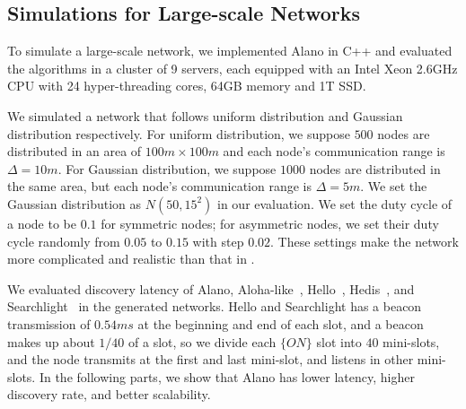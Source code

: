 \subsection{Simulations for Large-scale Networks}


To simulate a large-scale network, we implemented Alano in C++ and evaluated the algorithms in a cluster of 9 servers,
each equipped with an Intel Xeon 2.6GHz CPU with 24 hyper-threading cores, 64GB memory and 1T SSD.

We simulated a network that follows uniform distribution and Gaussian distribution respectively.
For uniform distribution, we suppose $500$ nodes are distributed in an area of $100m \times 100m$ 
and each node's communication range is $\Delta = 10m$. For Gaussian distribution, we suppose 
$1000$ nodes are distributed in the same area, but each node's communication range is $\Delta = 5m$. 
We set the Gaussian distribution as $N(50,15^2)$ in our evaluation.
We set the duty cycle of a node to be $0.1$ for symmetric nodes; 
for asymmetric nodes, we set their duty cycle randomly from $0.05$ to $0.15$ with step $0.02$.
These settings make the network more complicated and realistic than that in
\cite{wang2015blinddate, sun2014hello, bakht2012searchlight,
chen2015heterogeneous, kandhalu2010u, you2011aloha,
mcglynn2001birthday, song2014probabilistic, vasudevan2009neighbor}.


We evaluated discovery latency of Alano, Aloha-like~\cite{you2011aloha}, Hello~\cite{sun2014hello}, Hedis~\cite{chen2015heterogeneous}, and Searchlight~\cite{bakht2012searchlight} in the generated networks. %
Hello and Searchlight has a beacon transmission of $0.54ms$ at the beginning and end of each slot, and a beacon makes up about $1/40$ of a slot, so we divide each $\{ON\}$ slot into $40$ mini-slots, and the node transmits at the first and last mini-slot, and listens in other mini-slots.
In the following parts, we show that Alano has lower latency, higher discovery rate, and better scalability. %




